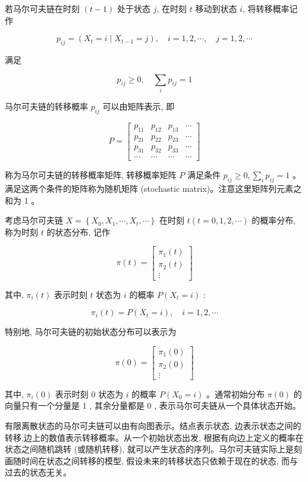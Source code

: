 \documentclass[10pt]{article}
\begin{document}
\begin{CJK*}{UTF8}{bsmi}
若马尔可夫链在时刻 $(t-1)$ 处于状态 $j$, 在时刻 $t$ 移动到状态 $i$, 将转移概率记作


\begin{equation*}
p_{i j}=\left(X_{t}=i \mid X_{t-1}=j\right), \quad i=1,2, \cdots, \quad j=1,2, \cdots \tag{19.9}
\end{equation*}


满足

$$
p_{i j} \geqslant 0, \quad \sum_{i} p_{i j}=1
$$

马尔可夫链的转移概率 $p_{i j}$ 可以由矩阵表示, 即

\[
P=\left[\begin{array}{cccc}
p_{11} & p_{12} & p_{13} & \cdots  \tag{19.10}\\
p_{21} & p_{22} & p_{23} & \cdots \\
p_{31} & p_{32} & p_{33} & \cdots \\
\cdots & \cdots & \cdots & \cdots
\end{array}\right]
\]

称为马尔可夫链的转移概率矩阵, 转移概率矩阵 $P$ 满足条件 $p_{i j} \geqslant 0, \sum_{i} p_{i j}=1$ 。满足这两个条件的矩阵称为随机矩阵 (stochastic matrix)。注意这里矩阵列元素之和为 1 。

考虑马尔可夫链 $X=\left\{X_{0}, X_{1}, \cdots, X_{t}, \cdots\right\}$ 在时刻 $t(t=0,1,2, \cdots)$ 的概率分布, 称为时刻 $t$ 的状态分布, 记作

\[
\pi(t)=\left[\begin{array}{c}
\pi_{1}(t)  \tag{19.11}\\
\pi_{2}(t) \\
\vdots
\end{array}\right]
\]

其中, $\pi_{i}(t)$ 表示时刻 $t$ 状态为 $i$ 的概率 $P\left(X_{t}=i\right)$ :

$$
\pi_{i}(t)=P\left(X_{t}=i\right), \quad i=1,2, \cdots
$$

特别地, 马尔可夫链的初始状态分布可以表示为

\[
\pi(0)=\left[\begin{array}{c}
\pi_{1}(0)  \tag{19.12}\\
\pi_{2}(0) \\
\vdots
\end{array}\right]
\]

其中, $\pi_{i}(0)$ 表示时刻 0 状态为 $i$ 的概率 $P\left(X_{0}=i\right)$ 。通常初始分布 $\pi(0)$ 的向量只有一个分量是 1 , 其余分量都是 0 , 表示马尔可夫链从一个具体状态开始。

有限离散状态的马尔可夫链可以由有向图表示。结点表示状态, 边表示状态之间的转移,边上的数值表示转移概率。从一个初始状态出发, 根据有向边上定义的概率在状态之间随机跳转 (或随机转移), 就可以产生状态的序列。马尔可夫链实际上是刻画随时间在状态之间转移的模型, 假设未来的转移状态只依赖于现在的状态, 而与过去的状态无关。


\end{CJK*}
\end{document}

